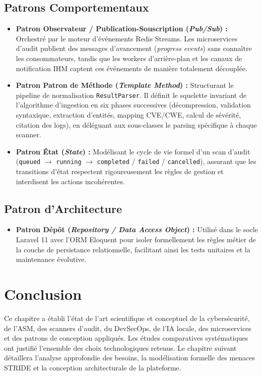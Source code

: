 \subsection{Patrons Comportementaux}
\begin{itemize}
    \item \textbf{Patron Observateur / Publication-Souscription (\textit{Pub/Sub}) :} Orchestr\'e par le moteur d'\'ev\'enements Redis Streams. Les microservices d'audit publient des messages d'avancement (\textit{progress events}) sans conna\^itre les consommateurs, tandis que les workers d'arri\`ere-plan et les canaux de notification IHM captent ces \'ev\'enements de mani\`ere totalement d\'ecoupl\'ee.
    \item \textbf{Patron Patron de M\'ethode (\textit{Template Method}) :} Structurant le pipeline de normalisation \texttt{ResultParser}. Il d\'efinit le squelette invariant de l'algorithme d'ingestion en six phases successives (d\'ecompression, validation syntaxique, extraction d'entit\'es, mapping CVE/CWE, calcul de s\'ev\'erit\'e, citation des logs), en d\'el\'eguant aux sous-classes le parsing sp\'ecifique \`a chaque scanner.
    \item \textbf{Patron \'Etat (\textit{State}) :} Mod\'elisant le cycle de vie formel d'un scan d'audit (\texttt{queued} $\rightarrow$ \texttt{running} $\rightarrow$ \texttt{completed} / \texttt{failed} / \texttt{cancelled}), assurant que les transitions d'\'etat respectent rigoureusement les r\`egles de gestion et interdisent les actions incoh\'erentes.
\end{itemize}

\subsection{Patron d'Architecture}
\begin{itemize}
    \item \textbf{Patron D\'ep\^ot (\textit{Repository / Data Access Object}) :} Utilis\'e dans le socle Laravel 11 avec l'ORM Eloquent pour isoler formellement les r\`egles m\'etier de la couche de persistance relationnelle, facilitant ainsi les tests unitaires et la maintenance \'evolutive.
\end{itemize}

\section*{Conclusion}
\par Ce chapitre a \'etabli l'\'etat de l'art scientifique et conceptuel de la cybers\'ecurit\'e, de l'ASM, des scanners d'audit, du DevSecOps, de l'IA locale, des microservices et des patrons de conception appliqu\'es. Les \'etudes comparatives syst\'ematiques ont justifi\'e l'ensemble des choix technologiques retenus. Le chapitre suivant d\'etaillera l'analyse approfondie des besoins, la mod\'elisation formelle des menaces STRIDE et la conception architecturale de la plateforme.
